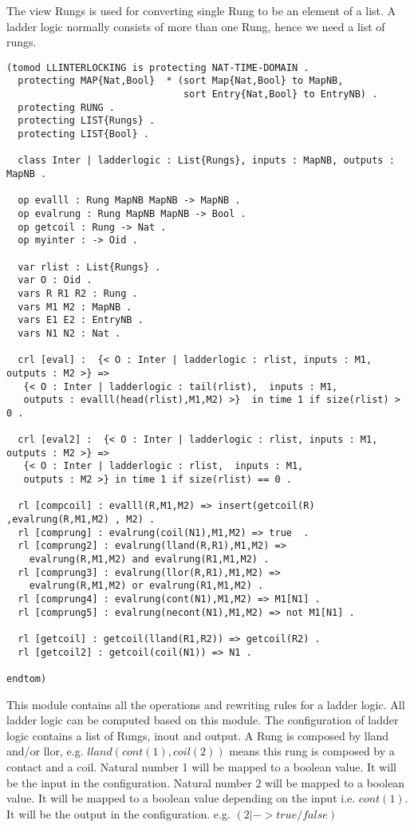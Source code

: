 \documentclass{article}
\begin{document}
The view Rungs is used for converting single Rung to be an element of a list. A ladder logic normally consists of more than one Rung, hence we need a list of rungs.

\begin{verbatim}
(tomod LLINTERLOCKING is protecting NAT-TIME-DOMAIN . 
  protecting MAP{Nat,Bool}  * (sort Map{Nat,Bool} to MapNB,
                               sort Entry{Nat,Bool} to EntryNB) .
  protecting RUNG .
  protecting LIST{Rungs} .
  protecting LIST{Bool} .

  class Inter | ladderlogic : List{Rungs}, inputs : MapNB, outputs : MapNB .
  
  op evalll : Rung MapNB MapNB -> MapNB .
  op evalrung : Rung MapNB MapNB -> Bool .
  op getcoil : Rung -> Nat .  
  op myinter : -> Oid .

  var rlist : List{Rungs} .
  var O : Oid .
  vars R R1 R2 : Rung .
  vars M1 M2 : MapNB .
  vars E1 E2 : EntryNB .
  vars N1 N2 : Nat .

  crl [eval] :  {< O : Inter | ladderlogic : rlist, inputs : M1, outputs : M2 >} => 
   {< O : Inter | ladderlogic : tail(rlist),  inputs : M1, 
   outputs : evalll(head(rlist),M1,M2) >}  in time 1 if size(rlist) > 0 .

  crl [eval2] :  {< O : Inter | ladderlogic : rlist, inputs : M1, outputs : M2 >} => 
   {< O : Inter | ladderlogic : rlist,  inputs : M1, 
   outputs : M2 >} in time 1 if size(rlist) == 0 .
  
  rl [compcoil] : evalll(R,M1,M2) => insert(getcoil(R) ,evalrung(R,M1,M2) , M2) .
  rl [comprung] : evalrung(coil(N1),M1,M2) => true  .
  rl [comprung2] : evalrung(lland(R,R1),M1,M2) => 
  	evalrung(R,M1,M2) and evalrung(R1,M1,M2) .
  rl [comprung3] : evalrung(llor(R,R1),M1,M2) => 
  	evalrung(R,M1,M2) or evalrung(R1,M1,M2) .
  rl [comprung4] : evalrung(cont(N1),M1,M2) => M1[N1] .
  rl [comprung5] : evalrung(necont(N1),M1,M2) => not M1[N1] .

  rl [getcoil] : getcoil(lland(R1,R2)) => getcoil(R2) .
  rl [getcoil2] : getcoil(coil(N1)) => N1 . 
  
endtom)
\end{verbatim}
This module contains all the operations and rewriting rules for a ladder logic. All ladder logic can be computed based on this module. The configuration of ladder logic contains a list of Rungs, inout and output. A Rung is composed by lland and/or llor, e.g. $lland(cont(1),coil(2))$ means this rung is composed by a contact and a coil. Natural number 1 will be mapped to a boolean value. It will be the input in the configuration.  Natural number 2 will be mapped to a boolean value. It will be mapped to a boolean value depending on the input i.e. $cont(1)$. It will be the output in the configuration. e.g. $(2|->true/false)$
\end{document}
